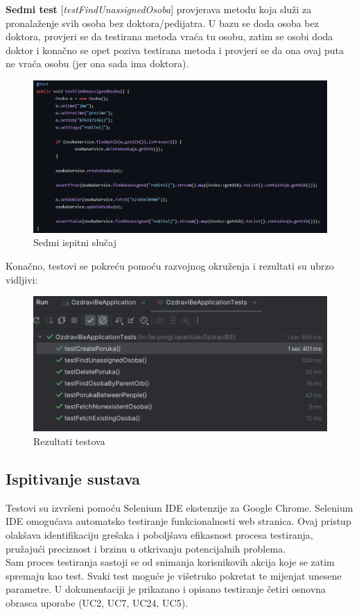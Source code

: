 		 	\noindent \textbf{Sedmi test} [\textit{testFindUnassignedOsoba}] provjerava metodu koja služi za pronalaženje svih osoba bez doktora/pedijatra. U bazu se doda osoba bez doktora, provjeri se da testirana metoda vraća tu osobu, zatim se osobi doda doktor i konačno se opet poziva testirana metoda i provjeri se da ona ovaj puta ne vraća osobu (jer ona sada ima doktora). 
		 	\begin{figure}[H]
		 		\includegraphics[width=\textwidth]{slike/junit_7.png}
		 		\caption{Sedmi ispitni slučaj}
		 		\label{fig:junit_7}
		 	\end{figure}
		 	
		 	\noindent Konačno, testovi se pokreću pomoću razvojnog okruženja i rezultati su ubrzo vidljivi:
		 	\begin{figure}[H]
		 		\includegraphics[width=\textwidth]{slike/junit_result.png}
		 		\caption{Rezultati testova}
		 		\label{fig:junit_result}
		 	\end{figure}
			
			\subsection{Ispitivanje sustava}
			
			Testovi su izvršeni pomoću Selenium IDE ekstenzije za Google Chrome. Selenium IDE omogućava automatsko testiranje funkcionalnosti web stranica. Ovaj pristup olakšava identifikaciju grešaka i poboljšava efikasnost procesa testiranja, pružajući preciznost i brzinu u otkrivanju potencijalnih problema.\\ 
				Sam proces testiranja sastoji se od snimanja korisnikovih akcija koje se zatim spremaju kao test. Svaki test moguće je višetruko pokretat te mijenjat unesene parametre. U dokumentaciji je prikazano i opisano testiranje četiri osnovna obrasca uporabe (UC2, UC7, UC24, UC5).\\
			
